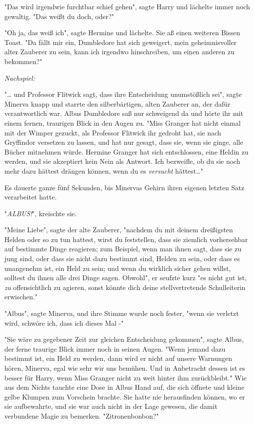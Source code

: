 {"Das wird irgendwie furchtbar schief gehen", sagte Harry und lächelte immer noch gewaltig. "Das weißt du doch, oder?"

"Oh ja, das weiß ich", sagte Hermine und lächelte. Sie aß einen weiteren Bissen Toast. "Da fällt mir ein, Dumbledore hat sich geweigert, mein geheimnisvoller alter Zauberer zu sein, kann ich irgendwo hinschreiben, um einen anderen zu bekommen?"

\emph{Nachspiel:}

"… und Professor Flitwick sagt, dass ihre Entscheidung unumstößlich sei", sagte Minerva knapp und starrte den silberbärtigen, alten Zauberer an, der dafür verantwortlich war. Albus Dumbledore saß nur schweigend da und hörte ihr mit einem fernen, traurigen Blick in den Augen zu. "Miss Granger hat nicht einmal mit der Wimper gezuckt, als Professor Flitwick ihr gedroht hat, sie nach Gryffindor versetzen zu lassen, und hat nur gesagt, dass sie, wenn sie ginge, alle Bücher mitnehmen würde. Hermine Granger hat sich entschlossen, eine Heldin zu werden, und sie akzeptiert kein Nein als Antwort. Ich bezweifle, ob du sie noch mehr dazu hättest drängen können, wenn du es \emph{versucht} hättest…"

Es dauerte ganze fünf Sekunden, bis Minervas Gehirn ihren eigenen letzten Satz verarbeitet hatte.

"\emph{ALBUS!}", kreischte sie.

"Meine Liebe", sagte der alte Zauberer, "nachdem du mit deinem dreißigsten Helden oder so zu tun hattest, wirst du feststellen, dass sie ziemlich vorhersehbar auf bestimmte Dinge reagieren; zum Beispiel, wenn man ihnen sagt, dass sie zu jung sind, oder dass sie nicht dazu bestimmt sind, Helden zu sein, oder dass es unangenehm ist, ein Held zu sein; und wenn du wirklich sicher gehen willst, solltest du ihnen alle drei Dinge sagen. Obwohl", er seufzte kurz "es nicht gut ist, \emph{zu} offensichtlich zu agieren, sonst könnte dich deine stellvertretende Schulleiterin erwischen."

"Albus", sagte Minerva, und ihre Stimme wurde noch fester, "wenn sie verletzt wird, schwöre ich, dass ich dieses Mal -"

"Sie wäre zu gegebener Zeit zur gleichen Entscheidung gekommen", sagte Albus, der ferne traurige Blick immer noch in seinen Augen. "Wenn jemand dazu bestimmt ist, ein Held zu werden, dann wird er nicht auf unsere Warnungen hören, Minerva, egal wie sehr wir uns bemühen. Und in Anbetracht dessen ist es besser für Harry, wenn Miss Granger nicht zu weit hinter ihm zurückbleibt." Wie aus dem Nichts tauchte eine Dose in Albus Hand auf, die sich öffnete und kleine gelbe Klumpen zum Vorschein brachte. Sie hatte nie herausfinden können, wo er sie aufbewahrte, und sie war auch nicht in der Lage gewesen, die damit verbundene Magie zu bemerken. "Zitronenbonbon?"

}
